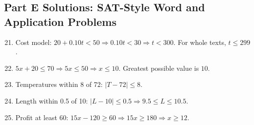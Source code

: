 \documentclass[14pt]{extarticle}
\begin{document}
\subsection*{Part E Solutions: SAT-Style Word and Application Problems}
\begin{enumerate}
    \setcounter{enumi}{20}
    \item Cost model: \(20 + 0.10t < 50 \Rightarrow 0.10t < 30 \Rightarrow t < \boxed{300}\). For whole texts, \(t \le 299\).
    \item \(5x + 20 \le 70 \Rightarrow 5x \le 50 \Rightarrow x \le \boxed{10}\). Greatest possible value is \(10\).
    \item Temperatures within 8 of 72: \(\boxed{|T - 72| \le 8}\).
    \item Length within 0.5 of 10: \(|L - 10| \le 0.5 \Rightarrow \boxed{9.5 \le L \le 10.5}\).
    \item Profit at least 60: \(15x - 120 \ge 60 \Rightarrow 15x \ge 180 \Rightarrow x \ge \boxed{12}\).
\end{enumerate}
\end{document}
